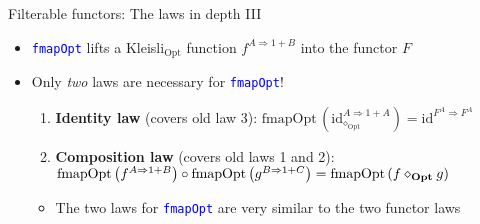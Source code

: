 \documentclass[english]{beamer}
\begin{document}
\begin{frame}{Filterable functors: The laws in depth III}
\begin{itemize}
\begin{itemize}
\begin{itemize}
the Kleisli identity!
\end{itemize}
\end{itemize}
\item \texttt{\textcolor{blue}{\footnotesize{}fmapOpt}} lifts a Kleisli$_{\text{Opt}}$
function $f^{A\Rightarrow1+B}$ into the functor $F$
\item Only \emph{two} laws are necessary for \texttt{\textcolor{blue}{\footnotesize{}fmapOpt}}!
\begin{enumerate}
\item \textbf{Identity law} (covers old law 3): {\footnotesize{}$\text{fmapOpt}\,(\text{id}_{\diamond_{\text{Opt}}}^{A\Rightarrow1+A})=\text{id}^{F^{A}\Rightarrow F^{A}}$}{\footnotesize \par}
\item \textbf{Composition law} (covers old laws 1 and 2): {\footnotesize{}$\text{fmapOpt}\left(f^{A\Rightarrow1+B}\right)\circ\text{fmapOpt}\left(g^{B\Rightarrow1+C}\right)=\text{fmapOpt}\left(f\diamond_{\text{\textbf{Opt}}}g\right)$}{\footnotesize \par}
\end{enumerate}
\begin{itemize}
\item The two laws for \texttt{\textcolor{blue}{\footnotesize{}fmapOpt}}
are very similar to the two functor laws
\end{itemize}
\end{itemize}
\end{frame}
\end{document}
